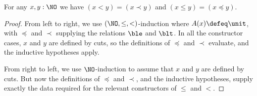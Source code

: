 %
\begin{thm}\label{thm:NO-encode-decode}
  For any $x,y:\NO$ we have $(x<y)=(x\prec y)$ and $(x\le y)=(x\preceq y)$.
\end{thm}

\begin{proof}
  From left to right, we use $(\NO,\le,<)$-induction where $A(x)\defeq\unit$, with $\preceq$ and $\prec$ supplying the relations $\ble$ and $\blt$.
  In all the constructor cases, $x$ and $y$ are defined by cuts, so the definitions of $\preceq$ and $\prec$ evaluate, and the inductive hypotheses apply.

  From right to left, we use $\NO$-induction to assume that $x$ and $y$ are defined by cuts.
  But now the definitions of $\preceq$ and $\prec$, and the inductive hypotheses, supply exactly the data required for the relevant constructors of $\le$ and $<$.
\end{proof}
